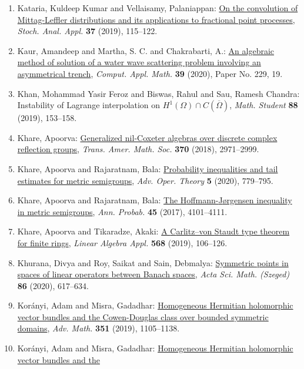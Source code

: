 \begin{enumerate}
\item Kataria, Kuldeep Kumar and Vellaisamy, Palaniappan: \href{https://doi.org/10.1080/07362994.2018.1538803}{On the convolution of {M}ittag-{L}effler distributions and its
applications to fractional point processes}, \emph{Stoch. Anal. Appl.} {\bf 37} (2019), 115--122.
\item Kaur, Amandeep and Martha, S. C. and Chakrabarti, A.: \href{https://doi.org/10.1007/s40314-020-01255-y}{An algebraic method of solution of a water wave scattering
problem involving an asymmetrical trench}, \emph{Comput. Appl. Math.} {\bf 39} (2020), Paper No. 229, 19.
\item Khan, Mohammad Yasir Feroz and Biswas, Rahul and Sau, Ramesh
Chandra: Instability of {L}agrange interpolation on {$H^1(\Omega)\cap
C(\overline\Omega)$}, \emph{Math. Student} {\bf 88} (2019), 153--158.
\item Khare, Apoorva: \href{https://doi.org/10.1090/tran/7304}{Generalized nil-{C}oxeter algebras over discrete complex
reflection groups}, \emph{Trans. Amer. Math. Soc.} {\bf 370} (2018), 2971--2999.
\item Khare, Apoorva and Rajaratnam, Bala: \href{https://doi.org/10.1007/s43036-020-00048-8}{Probability inequalities and tail estimates for metric
semigroups}, \emph{Adv. Oper. Theory} {\bf 5} (2020), 779--795.
\item Khare, Apoorva and Rajaratnam, Bala: \href{https://doi.org/10.1214/16-AOP1160}{The {H}offmann-{J}\o rgensen inequality in metric semigroups}, \emph{Ann. Probab.} {\bf 45} (2017), 4101--4111.
\item Khare, Apoorva and Tikaradze, Akaki: \href{https://doi.org/10.1016/j.laa.2018.05.035}{A {C}arlitz--von {S}taudt type theorem for finite rings}, \emph{Linear Algebra Appl.} {\bf 568} (2019), 106--126.
\item Khurana, Divya and Roy, Saikat and Sain, Debmalya: \href{https://doi.org/10.14232/actasm-020-420-6}{Symmetric points in spaces of linear operators between
{B}anach spaces}, \emph{Acta Sci. Math. (Szeged)} {\bf 86} (2020), 617--634.
\item Kor\'{a}nyi, Adam and Misra, Gadadhar: \href{https://doi.org/10.1016/j.aim.2019.05.018}{Homogeneous {H}ermitian holomorphic vector bundles and the
{C}owen-{D}ouglas class over bounded symmetric domains}, \emph{Adv. Math.} {\bf 351} (2019), 1105--1138.
\item Kor\'{a}nyi, Adam and Misra, Gadadhar: \href{https://doi.org/10.1016/j.crma.2015.11.002}{Homogeneous {H}ermitian holomorphic vector bundles and the
}
\end{enumerate}
